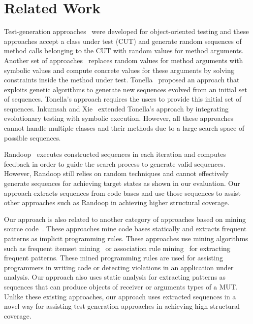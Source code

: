 \section{Related Work}
\label{sec:related}

Test-generation approaches~\cite{csallner:jcrasher, JTEST, pacheco:eclat, xie:rostra} were developed for object-oriented testing and these approaches accept a class under test (CUT) and generate random sequences of method calls belonging to the CUT with random values for method arguments. Another set of approaches~\cite{inkumsah08:improving} replaces random values for method arguments with symbolic values and compute concrete values for these arguments by solving constraints inside the method under test. Tonella~\cite{tonella:etoc} proposed an approach that exploits genetic algorithms to generate new sequences evolved from an initial set of sequences. Tonella's approach requires the users to provide this initial set of sequences. Inkumsah and Xie~\cite{inkumsah08:improving} extended Tonella's approach by integrating evolutionary testing with symbolic execution. However, all these approaches cannot handle multiple classes and their methods due to a large search space of possible sequences. 

Randoop~\cite{pacheco:feedback} executes constructed sequences in each iteration and computes feedback in order to guide the search process to generate valid sequences. However, Randoop still relies on random techniques and cannot effectively generate sequences for achieving target states as shown in our evaluation. Our approach extracts sequences from code bases and use those sequences to assist other approaches such as Randoop in achieving higher structural coverage.

Our approach is also related to another category of approaches based on mining source code~\cite{Engler2001deviant, acharya06:mining, wasylkowski07:detecting, thummalapenta07:parseweb, thummalapenta09:mining}. These approaches mine code bases statically and extracts frequent patterns as implicit programming rules. These approaches use mining algorithms such as frequent itemset mining~\cite{wang:bide} or association rule mining~\cite{agarwal:association} for extracting frequent patterns. These mined programming rules are used for assisting programmers in writing code or detecting violations in an application under analysis. Our approach also uses static analysis for extracting patterns as sequences that can produce objects of receiver or arguments types of a MUT. Unlike these existing approaches, our approach uses extracted sequences in a novel way for assisting test-generation approaches in achieving high structural coverage.


